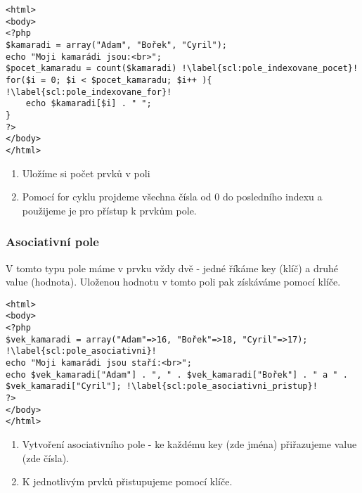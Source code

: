 \begin{minipage}[t]{.45\textwidth}
\begin{code}
\begin{verbatim}
<html>
<body>
<?php
$kamaradi = array("Adam", "Bořek", "Cyril");
echo "Moji kamarádi jsou:<br>";
$pocet_kamaradu = count($kamaradi) !\label{scl:pole_indexovane_pocet}!
for($i = 0; $i < $pocet_kamaradu; $i++ ){ !\label{scl:pole_indexovane_for}!
	echo $kamaradi[$i] . " ";
}
?> 
</body>
</html> 
\end{verbatim}

\label{code:php_pole_index_for}
\end{code}
\end{minipage}
\begin{minipage}[t]{.45\textwidth}
\vspace{2cm}
\begin{enumerate}
\item[ř. \ref{scl:pole_indexovane_pocet}:] Uložíme si počet prvků v poli
\vspace{0.4cm}
\item[ř. \ref{scl:pole_indexovane_for}:] Pomocí for cyklu projdeme všechna čísla od 0 do posledního indexu a použijeme je pro přístup k prvkům pole.
\end{enumerate}
\end{minipage}

\subsubsection{Asociativní pole}
V tomto typu pole máme v prvku vždy dvě  - jedné říkáme key (klíč) a druhé value (hodnota). Uloženou hodnotu v tomto poli pak získáváme pomocí klíče.

\begin{minipage}[t]{.45\textwidth}
\begin{code}
\begin{verbatim}
<html>
<body>
<?php
$vek_kamaradi = array("Adam"=>16, "Bořek"=>18, "Cyril"=>17); !\label{scl:pole_asociativni}!
echo "Moji kamarádi jsou staří:<br>";
echo $vek_kamaradi["Adam"] . ", " . $vek_kamaradi["Bořek"] . " a " . $vek_kamaradi["Cyril"]; !\label{scl:pole_asociativni_pristup}!
?> 
</body>
</html> 
\end{verbatim}

\label{code:php_pole_asoc}
\end{code}
\end{minipage}
\begin{minipage}[t]{.45\textwidth}
\vspace{2.5cm}
\begin{enumerate}
\item[ř. \ref{scl:pole_asociativni}:] Vytvoření asociativního pole - ke každému key (zde jména) přiřazujeme value (zde čísla).
\item[ř. \ref{scl:pole_asociativni_pristup}:] K jednotlivým prvků přistupujeme pomocí klíče.
\end{enumerate}
\end{minipage} 

